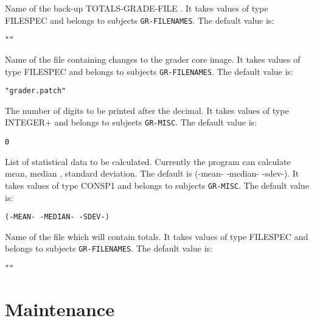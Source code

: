 \begin{description}
\item[OLD-TOTALS-GRADE-FILE]  
Name of the back-up TOTALS-GRADE-FILE .
It takes values of type FILESPEC and belongs to subjects \texttt{GR-FILENAMES}.  The default value is: \begin{lstlisting}
""
\end{lstlisting}

\item[PATCH-FILE]  
Name of the file containing changes to the grader core image.
It takes values of type FILESPEC and belongs to subjects \texttt{GR-FILENAMES}.  The default value is: \begin{lstlisting}
"grader.patch"
\end{lstlisting}

\item[PRINT-N-DIGITS]  
The number of digits to be printed after the decimal.
It takes values of type INTEGER+ and belongs to subjects \texttt{GR-MISC}.  The default value is: \begin{lstlisting}
0
\end{lstlisting}

\item[STATISTICAL-OPTIONS]  
List of statistical data to be calculated. Currently the
	 program can calculate mean, median , standard deviation.
	 The default is (-mean- -median- -sdev-).
It takes values of type CONSP1 and belongs to subjects \texttt{GR-MISC}.  The default value is: \begin{lstlisting}
(-MEAN- -MEDIAN- -SDEV-)
\end{lstlisting}

\item[TOTALS-GRADE-FILE]  
Name of the file which will contain totals.
It takes values of type FILESPEC and belongs to subjects \texttt{GR-FILENAMES}.  The default value is: \begin{lstlisting}
""
\end{lstlisting}

\item
\end{description}

\section{Maintenance}

